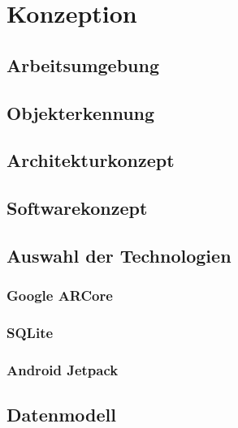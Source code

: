 
\chapter{Konzeption}
\section{Arbeitsumgebung}

\section{Objekterkennung}

\section{Architekturkonzept}
\section{Softwarekonzept}

\section{Auswahl der Technologien}
\subsection{Google ARCore}
\subsection{SQLite}
\subsection{Android Jetpack} 

\section{Datenmodell}